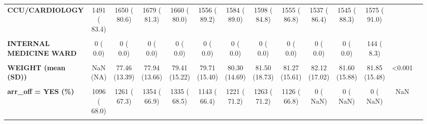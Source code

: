 \documentclass[
]{article}
\begin{document}
\begin{table}[H]
\begin{tabular}[t]{>{\raggedright\arraybackslash}p{5em}ccccccccccccc}
\textbf{CCU/CARDIOLOGY} & 1491 ( 83.4) & 1650 ( 80.6) & 1679 ( 81.3) & 1660 ( 80.0) & 1556 ( 89.2) & 1584 ( 89.0) & 1598 ( 84.8) & 1555 ( 86.8) & 1537 ( 86.4) & 1545 ( 88.3) & 1575 ( 91.0) &  & \\
\textbf{\cellcolor{gray!10}{INTERNAL MEDICINE}} & \cellcolor{gray!10}{278 ( 15.5)} & \cellcolor{gray!10}{352 ( 17.2)} & \cellcolor{gray!10}{338 ( 16.4)} & \cellcolor{gray!10}{381 ( 18.4)} & \cellcolor{gray!10}{178 ( 10.2)} & \cellcolor{gray!10}{168 (  9.4)} & \cellcolor{gray!10}{254 ( 13.5)} & \cellcolor{gray!10}{220 ( 12.3)} & \cellcolor{gray!10}{221 ( 12.4)} & \cellcolor{gray!10}{184 ( 10.5)} & \cellcolor{gray!10}{0 (  0.0)} & \cellcolor{gray!10}{} & \cellcolor{gray!10}{}\\
\textbf{INTERNAL MEDICINE WARD} & 0 (  0.0) & 0 (  0.0) & 0 (  0.0) & 0 (  0.0) & 0 (  0.0) & 0 (  0.0) & 0 (  0.0) & 0 (  0.0) & 0 (  0.0) & 0 (  0.0) & 144 (  8.3) &  & \\
\textbf{\cellcolor{gray!10}{OTHER}} & \cellcolor{gray!10}{19 (  1.1)} & \cellcolor{gray!10}{45 (  2.2)} & \cellcolor{gray!10}{48 (  2.3)} & \cellcolor{gray!10}{34 (  1.6)} & \cellcolor{gray!10}{11 (  0.6)} & \cellcolor{gray!10}{27 (  1.5)} & \cellcolor{gray!10}{33 (  1.8)} & \cellcolor{gray!10}{16 (  0.9)} & \cellcolor{gray!10}{20 (  1.1)} & \cellcolor{gray!10}{21 (  1.2)} & \cellcolor{gray!10}{12 (  0.7)} & \cellcolor{gray!10}{} & \cellcolor{gray!10}{}\\
\textbf{WEIGHT (mean (SD))} & NaN (NA) & 77.46 (13.39) & 77.94 (13.66) & 79.41 (15.22) & 79.71 (15.40) & 80.30 (14.69) & 81.50 (18.73) & 81.27 (15.61) & 82.12 (17.02) & 81.60 (15.88) & 81.85 (15.48) & <0.001 & \\
\textbf{\cellcolor{gray!10}{ang\_off = YES (\%)}} & \cellcolor{gray!10}{0 (  NaN)} & \cellcolor{gray!10}{0 (  NaN)} & \cellcolor{gray!10}{0 (  NaN)} & \cellcolor{gray!10}{0 (  NaN)} & \cellcolor{gray!10}{496 ( 32.9)} & \cellcolor{gray!10}{660 ( 41.6)} & \cellcolor{gray!10}{610 ( 40.1)} & \cellcolor{gray!10}{630 ( 40.8)} & \cellcolor{gray!10}{0 (  NaN)} & \cellcolor{gray!10}{0 (  NaN)} & \cellcolor{gray!10}{0 (  NaN)} & \cellcolor{gray!10}{NaN} & \cellcolor{gray!10}{}\\
\textbf{arr\_off = YES (\%)} & 1096 ( 68.0) & 1261 ( 67.3) & 1354 ( 66.9) & 1335 ( 68.5) & 1143 ( 66.4) & 1221 ( 71.2) & 1263 ( 71.2) & 1126 ( 66.8) & 0 (  NaN) & 0 (  NaN) & 0 (  NaN) & NaN & \\
\textbf{\cellcolor{gray!10}{crechgge0\_3 = YES (\%)}} & \cellcolor{gray!10}{0 (  NaN)} & \cellcolor{gray!10}{0 (  NaN)} & \cellcolor{gray!10}{0 (  NaN)} & \cellcolor{gray!10}{0 (  NaN)} & \cellcolor{gray!10}{0 (  NaN)} & \cellcolor{gray!10}{0 (  NaN)} & \cellcolor{gray!10}{0 (  NaN)} & \cellcolor{gray!10}{100 (  6.2)} & \cellcolor{gray!10}{90 (  6.2)} & \cellcolor{gray!10}{88 (  6.0)} & \cellcolor{gray!10}{61 (  4.6)} & \cellcolor{gray!10}{NaN} & \cellcolor{gray!10}{}\\

\end{tabular}
\end{table}
\end{document}
